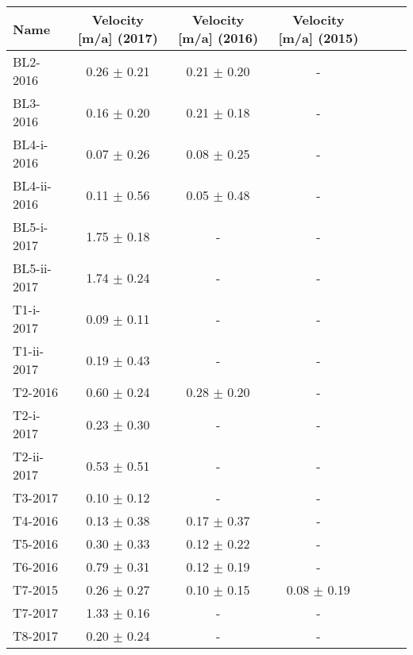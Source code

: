 \begin{tabular}{lcccccc}
\toprule
        Name & Velocity [m/a] (2017) & Velocity [m/a] (2016) & Velocity [m/a] (2015) \\
\midrule
    BL2-2016 &       0.26 $\pm$ 0.21 &       0.21 $\pm$ 0.20 &                     - \\
    BL3-2016 &       0.16 $\pm$ 0.20 &       0.21 $\pm$ 0.18 &                     - \\
  BL4-i-2016 &       0.07 $\pm$ 0.26 &       0.08 $\pm$ 0.25 &                     - \\
 BL4-ii-2016 &       0.11 $\pm$ 0.56 &       0.05 $\pm$ 0.48 &                     - \\
  BL5-i-2017 &       1.75 $\pm$ 0.18 &                     - &                     - \\
 BL5-ii-2017 &       1.74 $\pm$ 0.24 &                     - &                     - \\
   T1-i-2017 &       0.09 $\pm$ 0.11 &                     - &                     - \\
  T1-ii-2017 &       0.19 $\pm$ 0.43 &                     - &                     - \\
     T2-2016 &       0.60 $\pm$ 0.24 &       0.28 $\pm$ 0.20 &                     - \\
   T2-i-2017 &       0.23 $\pm$ 0.30 &                     - &                     - \\
  T2-ii-2017 &       0.53 $\pm$ 0.51 &                     - &                     - \\
     T3-2017 &       0.10 $\pm$ 0.12 &                     - &                     - \\
     T4-2016 &       0.13 $\pm$ 0.38 &       0.17 $\pm$ 0.37 &                     - \\
     T5-2016 &       0.30 $\pm$ 0.33 &       0.12 $\pm$ 0.22 &                     - \\
     T6-2016 &       0.79 $\pm$ 0.31 &       0.12 $\pm$ 0.19 &                     - \\
     T7-2015 &       0.26 $\pm$ 0.27 &       0.10 $\pm$ 0.15 &       0.08 $\pm$ 0.19 \\
     T7-2017 &       1.33 $\pm$ 0.16 &                     - &                     - \\
     T8-2017 &       0.20 $\pm$ 0.24 &                     - &                     - \\
\bottomrule
\end{tabular}
